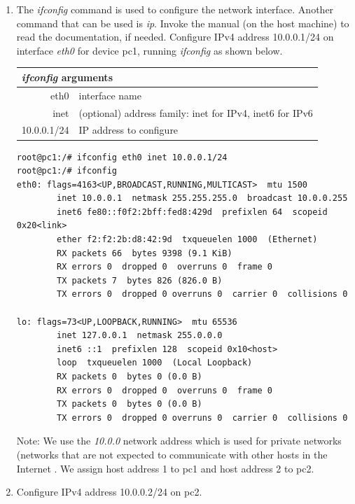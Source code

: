 \documentclass[12pt]{book}
\begin{document}
\begin{enumerate}[resume*]
\item The \emph{ifconfig} command is used to configure the network interface. Another command that can be used is \emph{ip}. Invoke the manual (on the host machine) to read the documentation, if needed. Configure IPv4 address 10.0.0.1/24 on interface \emph{eth0} for device pc1, running \emph{ifconfig} as shown below.

  \begin{tabular}{r l}
    \toprule
    \multicolumn{2}{l}{\emph{ifconfig} arguments} \\ \midrule
    eth0 & interface name \\
    inet & (optional) address family: inet for IPv4, inet6 for IPv6 \\
    10.0.0.1/24 & IP address to configure \\ \bottomrule
  \end{tabular}

  \begin{lstlisting}
root@pc1:/# ifconfig eth0 inet 10.0.0.1/24
root@pc1:/# ifconfig
eth0: flags=4163<UP,BROADCAST,RUNNING,MULTICAST>  mtu 1500
        inet 10.0.0.1  netmask 255.255.255.0  broadcast 10.0.0.255
        inet6 fe80::f0f2:2bff:fed8:429d  prefixlen 64  scopeid 0x20<link>
        ether f2:f2:2b:d8:42:9d  txqueuelen 1000  (Ethernet)
        RX packets 66  bytes 9398 (9.1 KiB)
        RX errors 0  dropped 0  overruns 0  frame 0
        TX packets 7  bytes 826 (826.0 B)
        TX errors 0  dropped 0 overruns 0  carrier 0  collisions 0

lo: flags=73<UP,LOOPBACK,RUNNING>  mtu 65536
        inet 127.0.0.1  netmask 255.0.0.0
        inet6 ::1  prefixlen 128  scopeid 0x10<host>
        loop  txqueuelen 1000  (Local Loopback)
        RX packets 0  bytes 0 (0.0 B)
        RX errors 0  dropped 0  overruns 0  frame 0
        TX packets 0  bytes 0 (0.0 B)
        TX errors 0  dropped 0 overruns 0  carrier 0  collisions 0
  \end{lstlisting}

  Note: We use the \emph{10.0.0} network address which is used for private networks (networks that are not expected to communicate with other hosts in the Internet \cite{rfc1918}. We assign host address 1 to pc1 and host address 2 to pc2.

\item Configure IPv4 address 10.0.0.2/24 on pc2.

  \end{enumerate}
\end{document}
